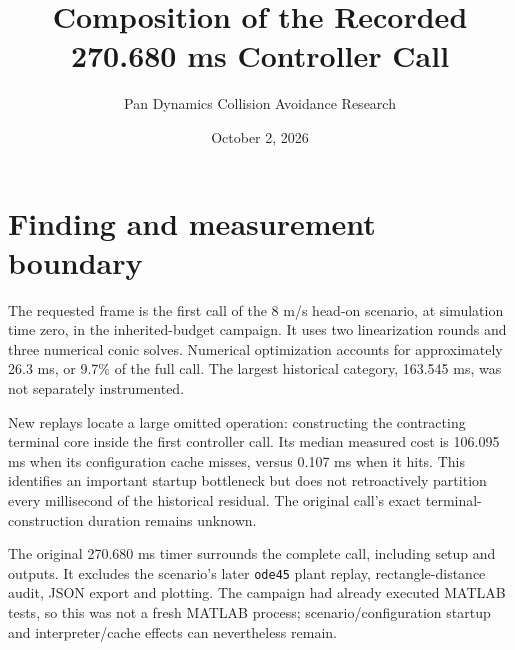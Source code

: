 \documentclass[11pt]{article}
\title{Composition of the Recorded 270.680 ms Controller Call}
\author{Pan Dynamics Collision Avoidance Research}
\date{October 2, 2026}
\begin{document}
\maketitle

\section{Finding and measurement boundary}
The requested frame is the first call of the 8 m/s head-on scenario,
at simulation time zero, in the inherited-budget campaign. It uses two
linearization rounds and three numerical conic solves. Numerical optimization
accounts for approximately 26.3 ms, or 9.7\% of the full call. The largest
historical category, 163.545 ms, was not separately instrumented.

New replays locate a large omitted operation: constructing the contracting
terminal core inside the first controller call. Its median measured cost is
106.095 ms when its configuration cache misses, versus 0.107 ms when it hits.
This identifies an important startup bottleneck but does not retroactively
partition every millisecond of the historical residual. The original call's
exact terminal-construction duration remains unknown.

The original 270.680 ms timer surrounds the complete
 call, including setup and outputs. It
excludes the scenario's later \texttt{ode45} plant replay, rectangle-distance
audit, JSON export and plotting. The campaign had already executed MATLAB
tests, so this was not a fresh MATLAB process; scenario/configuration startup
and interpreter/cache effects can nevertheless remain.
\end{document}

